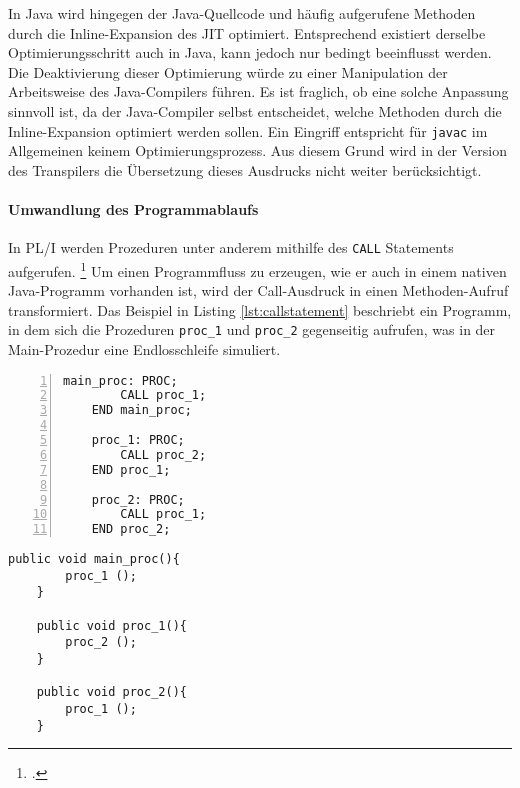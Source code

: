 In Java wird hingegen der Java-Quellcode und häufig aufgerufene Methoden durch die Inline-Expansion des \ac{JIT} optimiert. Entsprechend existiert derselbe Optimierungsschritt auch in Java, kann jedoch nur bedingt beeinflusst werden. Die Deaktivierung dieser Optimierung würde zu einer Manipulation der Arbeitsweise des Java-Compilers führen. Es ist fraglich, ob eine solche Anpassung sinnvoll ist, da der Java-Compiler selbst entscheidet, welche Methoden durch die Inline-Expansion optimiert werden sollen. Ein Eingriff entspricht für \verb+javac+ im Allgemeinen keinem Optimierungsprozess.
Aus diesem Grund wird in der Version des Transpilers die Übersetzung dieses Ausdrucks nicht weiter berücksichtigt.

\paragraph*{Umwandlung des Programmablaufs}

In PL/I werden Prozeduren unter anderem mithilfe des \verb+CALL+ Statements aufgerufen. \footcite[Vgl. ][S.133ff. ]{pliref} Um einen Programmfluss zu erzeugen, wie er auch in einem nativen Java-Programm vorhanden ist, wird der Call-Ausdruck in einen Methoden-Aufruf transformiert. 
Das Beispiel in Listing \ref{lst:callstatement} beschriebt ein Programm, in dem sich die Prozeduren \verb+proc_1+ und \verb+proc_2+ gegenseitig aufrufen, was in der Main-Prozedur eine Endlosschleife simuliert.

\begin{minipage}[b]{0.48\linewidth}
	\centering
	\lstset{language=PL/I,label=SliceExaple}
	\begin{lstlisting}[frame=single, numbers=left, mathescape,%
		caption={Transformation Prozeduraufrufe}, label={lst:callstatement},
		basicstyle=\fontsize{9}{13}\selectfont\ttfamily]
	main_proc: PROC;
		CALL proc_1;
	END main_proc;
		
	proc_1: PROC;
		CALL proc_2;
	END proc_1;
		
	proc_2: PROC;
		CALL proc_1;
	END proc_2;
	\end{lstlisting}
\end{minipage}
\hspace{0.5cm}
\begin{minipage}[b]{0.48\linewidth}
	\centering
	\lstset{language=Java,label=SliceExaple}
	\begin{lstlisting}[frame=single, mathescape,%
		title={" "},
		basicstyle=\fontsize{9}{13}\selectfont\ttfamily]
	public void main_proc(){
		proc_1 ();
	}
		
	public void proc_1(){
		proc_2 ();
	}
		
	public void proc_2(){
		proc_1 ();
	}
	\end{lstlisting}
\end{minipage}


